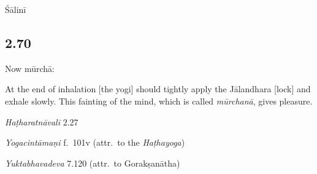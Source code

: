 \begin{ekdosis}
\begin{metre}[hp02_069]
Śālinī 
\end{metre}

\subsection*{2.70}
\begin{translation}[hp02_070]
Now mūrchā:

At the end of inhalation [the yogi] should tightly apply the Jālandhara [lock] and exhale slowly. This fainting of the mind, which is called \emph{mūrchanā}, gives pleasure.
\end{translation}

\begin{sources}[hp02_070]
\emph{Haṭharatnāvalī} 2.27

\begin{versinnote}
\end{versinnote}

\emph{Yogacintāmaṇi} f.~101v (attr.~to the \emph{Haṭhayoga})

\begin{versinnote}
\end{versinnote}

\emph{Yuktabhavadeva} 7.120 (attr.~to Gorakṣanātha)

\begin{versinnote}
\end{versinnote}


\end{sources}
\end{ekdosis}
